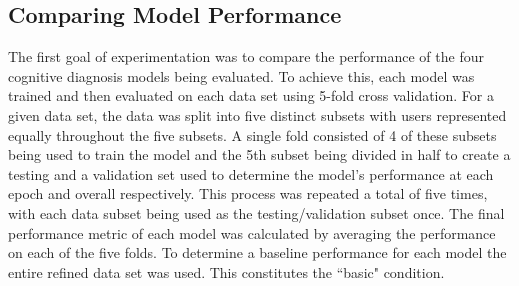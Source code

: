 \documentclass[letterpaper, 12pt, captions=tableabove]{scrreprt}
\begin{document}
		\subsection{Comparing Model Performance}
		\label{sub:comparingModelPerformance}
			The first goal of experimentation was to compare the performance of the four cognitive diagnosis models being evaluated. To achieve this, each model was trained and then evaluated on each data set using 5-fold cross validation. For a given data set, the data was split into five distinct subsets with users represented equally throughout the five subsets. A single fold consisted of 4 of these subsets being used to train the model and the 5th subset being divided in half to create a testing and a validation set used to determine the model's performance at each epoch and overall respectively. This process was repeated a total of five times, with each data subset being used as the testing/validation subset once. The final performance metric of each model was calculated by averaging the performance on each of the five folds. To determine a baseline performance for each model the entire refined data set was used. This constitutes the ``basic" condition. 
\end{document}
